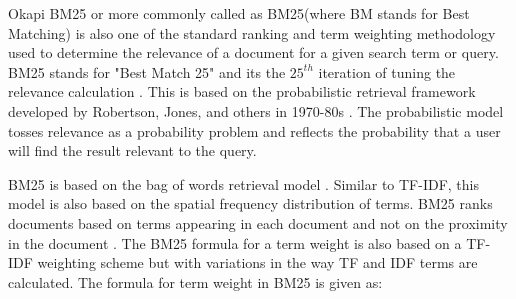 Okapi BM25 or more commonly called as BM25(where BM stands for Best Matching) is also one of the standard ranking and term weighting methodology used to determine the relevance of a document for a given search term or query. BM25 stands for "Best Match 25" and its the $25^{th}$ iteration of tuning the relevance calculation \cite{doug2015bm25}. This is based on the probabilistic retrieval framework developed by Robertson, Jones, and others in 1970-80s \cite{robertson2009probabilistic}. The probabilistic model tosses relevance as a probability problem and reflects the probability that a user will find the result relevant to the query.

BM25 is based on the bag of words retrieval model \cite{robertson2009probabilistic}. Similar to TF-IDF, this model is also based on the spatial frequency distribution of terms. BM25 ranks documents based on terms appearing in each document and not on the proximity in the document \cite{Amati2009}. 
The BM25 formula for a term weight is also based on a TF-IDF weighting scheme but with variations in the way TF and IDF terms are calculated. The formula for term weight in BM25 is given as:

